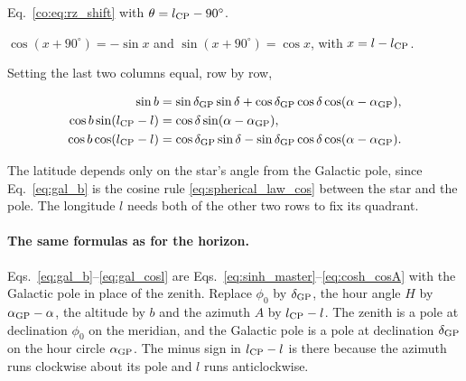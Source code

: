 \begin{explain}
	\item Eq.~\eqref{co:eq:rz_shift} with $\theta=l_{\rm CP}-90^\circ$.
	\item $\cos(x+90^\circ)=-\sin x$ and $\sin(x+90^\circ)=\cos x$, with $x=l-l_{\rm CP}$.
\end{explain}
Setting the last two columns equal, row by row,
\begin{keyresult}
	\begin{align}
		\sin b &= \sin\delta_{\rm GP}\sin\delta + \cos\delta_{\rm GP}\cos\delta\cos(\alpha - \alpha_{\rm GP}), \label{eq:gal_b} \\
		\cos b\sin(l_{\rm CP} - l) &= \cos\delta\sin(\alpha - \alpha_{\rm GP}), \label{eq:gal_sinl} \\
		\cos b\cos(l_{\rm CP} - l) &= \cos\delta_{\rm GP}\sin\delta - \sin\delta_{\rm GP}\cos\delta\cos(\alpha - \alpha_{\rm GP}). \label{eq:gal_cosl}
	\end{align}
\end{keyresult}
The latitude depends only on the star's angle from the Galactic pole, since Eq.~\eqref{eq:gal_b} is the cosine rule \eqref{eq:spherical_law_cos} between the star and the pole. The longitude $l$ needs both of the other two rows to fix its quadrant.

\paragraph{The same formulas as for the horizon.} Eqs.~\eqref{eq:gal_b}--\eqref{eq:gal_cosl} are Eqs.~\eqref{eq:sinh_master}--\eqref{eq:cosh_cosA} with the Galactic pole in place of the zenith. Replace $\phi_0$ by $\delta_{\rm GP}$, the hour angle $H$ by $\alpha_{\rm GP}-\alpha$, the altitude by $b$ and the azimuth $A$ by $l_{\rm CP}-l$. The zenith is a pole at declination $\phi_0$ on the meridian, and the Galactic pole is a pole at declination $\delta_{\rm GP}$ on the hour circle $\alpha_{\rm GP}$. The minus sign in $l_{\rm CP}-l$ is there because the azimuth runs clockwise about its pole and $l$ runs anticlockwise.


